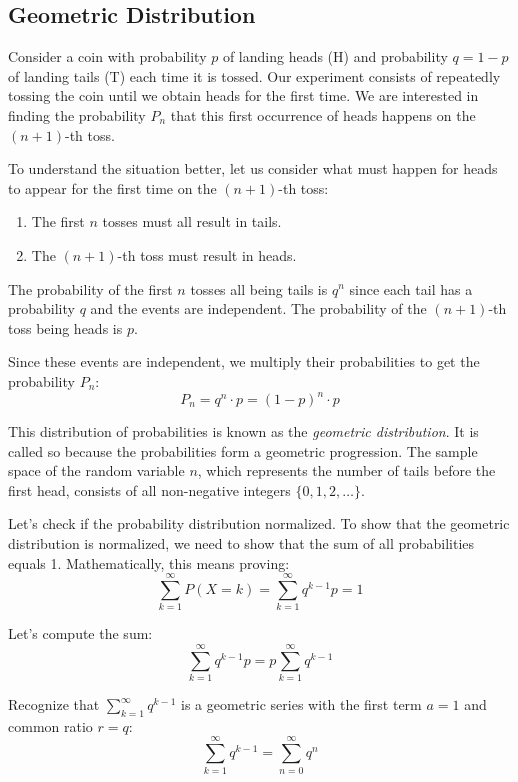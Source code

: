 \subsection{Geometric Distribution}

Consider a coin with probability \( p \) of landing heads (H) and probability \( q = 1 - p \) of landing tails (T) each time it is tossed. Our experiment consists of repeatedly tossing the coin until we obtain heads for the first time. We are interested in finding the probability \( P_n \) that this first occurrence of heads happens on the \((n + 1)\)-th toss.

To understand the situation better, let us consider what must happen for heads to appear for the first time on the \((n + 1)\)-th toss:
\begin{enumerate}
    \item The first \( n \) tosses must all result in tails.
    \item The \((n + 1)\)-th toss must result in heads.
\end{enumerate}

\begin{definition}
    The probability of the first \( n \) tosses all being tails is \( q^n \) since each tail has a probability \( q \) and the events are independent. The probability of the \((n + 1)\)-th toss being heads is \( p \).

    Since these events are independent, we multiply their probabilities to get the probability \( P_n \):
    \[
        P_n = q^n \cdot p = (1 - p)^n \cdot p
    \]

    This distribution of probabilities is known as the \textit{geometric distribution}. It is called so because the probabilities form a geometric progression. The sample space of the random variable \( n \), which represents the number of tails before the first head, consists of all non-negative integers \( \{0, 1, 2, \ldots\} \).

\end{definition}

Let's check if the probability distribution normalized. To show that the geometric distribution is normalized, we need to show that the sum of all probabilities equals 1. Mathematically, this means proving:
\[
    \sum_{k=1}^{\infty} P(X = k) = \sum_{k=1}^{\infty} q^{k-1} p = 1
\]

Let's compute the sum:
\[
    \sum_{k=1}^{\infty} q^{k-1} p = p \sum_{k=1}^{\infty} q^{k-1}
\]

Recognize that \( \sum_{k=1}^{\infty} q^{k-1} \) is a geometric series with the first term \( a = 1 \) and common ratio \( r = q \):
\[
    \sum_{k=1}^{\infty} q^{k-1} = \sum_{n=0}^{\infty} q^n
\]


